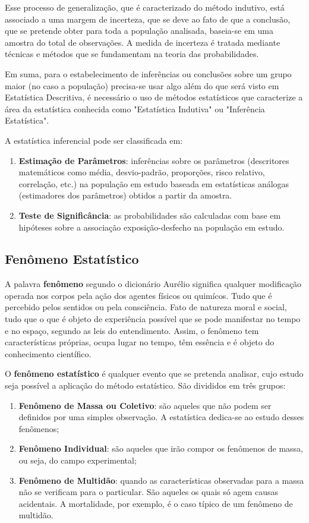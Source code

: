 Esse processo de generalização, que é caracterizado do método indutivo, está associado a uma margem de incerteza, que se deve ao fato de que a conclusão, que se pretende obter para toda a população analisada, baseia-se em uma amostra do total de observações. A medida de incerteza é tratada mediante técnicas e métodos que se fundamentam na teoria das probabilidades.\vskip0.3cm


Em suma, para o estabelecimento de inferências ou conclusões sobre um grupo maior (no caso a população) precisa-se usar algo além do que será visto em Estatística Descritiva, é necessário o uso de métodos estatísticos que caracterize a área da estatística conhecida como "Estatística Indutiva" ou "Inferência Estatística".\vskip0.3cm

A estatística inferencial pode ser classificada em:

\begin{enumerate}
  \item \textbf{Estimação de Parâmetros}: inferências sobre os parâmetros (descritores matemáticos como média, desvio-padrão, proporções, risco relativo, correlação, etc.) na população em estudo baseada em estatísticas análogas (estimadores dos parâmetros) obtidos a partir da amostra.
  \item \textbf{Teste de Significância}: as probabilidades são calculadas com base em hi\-pó\-te\-ses sobre a associação exposição-desfecho na população em estudo.
\end{enumerate}


\subsection{Fenômeno Estatístico}

\inic A palavra \textbf{fenômeno} segundo o dicionário Aurélio significa qualquer modificação operada nos corpos pela ação dos agentes físicos ou quimícos. Tudo que é percebido pelos sentidos ou pela consciência. Fato de natureza moral e social, tudo que o que é objeto de experiência possível que se pode manifestar no tempo e no espaço, segundo as leis do entendimento. Assim, o fenômeno tem características próprias, ocupa lugar no tempo, têm essência e é objeto do conhecimento científico. \vskip0.3cm   

\inic O \textbf{fenômeno estatístico} é qualquer evento que se pretenda analisar, cujo estudo seja possível a aplicação do método estatístico. São divididos em três grupos:

\begin{enumerate}
  \item \textbf{Fenômeno de Massa ou Coletivo}: são aqueles que não podem ser definidos por uma simples observação. A estatística dedica-se ao estudo desses fenômenos;
  \item \textbf{Fenômeno Individual}: são aqueles que irão compor os fenômenos de massa, ou seja, do campo experimental;
  \item \textbf{Fenômeno de Multidão}: quando as características observadas para a massa não se verificam para o particular. São aqueles os quais só agem causas acidentais. A mortalidade, por exemplo, é o caso típico de um fenômeno de multidão.
\end{enumerate}


